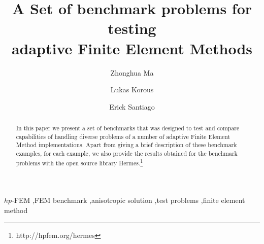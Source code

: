 \begin{frontmatter}

\title{A Set of benchmark problems for testing\\ adaptive Finite Element Methods}

\author[label1]{Zhonghua Ma}
\author[label2]{Lukas Korous}
\author[label3]{Erick Santiago}
\address[label1]{China University of Petroleum, Beijing, China}
\address[label2]{Charles University, Prague, Czech Republic}
\address[label3]{University of Nevada, Reno, USA}

\begin{abstract}
In this paper we present a set of benchmarks that was designed to 
test and compare capabilities of handling diverse problems of a number
of adaptive Finite Element Method implementations. Apart from giving 
a brief description of these benchmark examples, for each example, we 
also provide the results obtained for the benchmark problems with the 
open source library {\sc Hermes}.\footnote{http://hpfem.org/hermes}
\end{abstract}

\begin{keyword}
$hp$-FEM \sep FEM benchmark \sep anisotropic solution \sep test problems \sep finite element method
\end{keyword}

\end{frontmatter}
